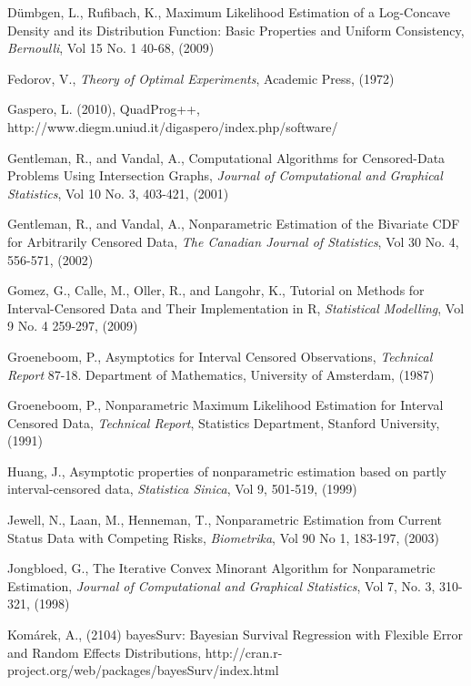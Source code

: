 \begin{thebibliography}{}
D\"umbgen, L., Rufibach, K., Maximum Likelihood Estimation of a Log-Concave Density and its Distribution Function: Basic Properties and Uniform Consistency, \emph{Bernoulli}, Vol 15 No. 1 40-68, (2009)

Fedorov, V., \emph{Theory of Optimal Experiments}, Academic Press, (1972) 

Gaspero, L. (2010), QuadProg++,  http://www.diegm.uniud.it/digaspero/index.php/software/

Gentleman, R., and Vandal, A., Computational Algorithms for Censored-Data Problems Using Intersection Graphs, \emph{Journal of Computational and Graphical Statistics}, Vol 10 No. 3, 403-421, (2001)


Gentleman, R., and Vandal, A., Nonparametric Estimation of the Bivariate CDF for Arbitrarily Censored Data, \emph{The Canadian Journal of Statistics}, Vol 30 No. 4, 556-571, (2002)

Gomez, G., Calle, M., Oller, R., and Langohr, K., Tutorial on Methods for Interval-Censored Data and Their Implementation in R, \emph{Statistical Modelling}, Vol 9 No. 4 259-297, (2009)

Groeneboom, P., Asymptotics for Interval Censored Observations, \emph{Technical Report} 87-18. Department of Mathematics, University of Amsterdam, (1987) 

Groeneboom, P., Nonparametric Maximum Likelihood Estimation for Interval Censored Data, \emph{Technical Report}, Statistics Department, Stanford University, (1991)


Huang, J., Asymptotic properties of nonparametric estimation based on partly interval-censored data, \emph{Statistica Sinica}, Vol 9, 501-519, (1999)

Jewell, N., Laan, M., Henneman, T., Nonparametric Estimation from Current Status Data with Competing Risks, \emph{Biometrika}, Vol 90 No 1, 183-197, (2003)

Jongbloed, G., The Iterative Convex Minorant Algorithm for Nonparametric Estimation, \emph{Journal of Computational and Graphical Statistics}, Vol 7, No. 3, 310-321, (1998)


Kom\'arek, A., (2104) bayesSurv: Bayesian Survival Regression with Flexible Error and Random Effects Distributions, http://cran.r-project.org/web/packages/bayesSurv/index.html



\end{thebibliography}
